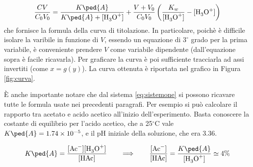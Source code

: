 \begin{equation}
    \frac{CV}{C_0V_0} = \frac{K\ped{A}}{K\ped{A} + \ce{[H3O+]}} + \frac{V + V_0}{C_0V_0} \left(\frac{K_w}{\ce{[H3O+]}} - \ce{[H3O+]} \right)
    \label{eq:curv}
\end{equation}
%
che fornisce la formula della curva di titolazione. In particolare, poichè è difficile isolare la varibile \ce{[H3O+]} in funzione di $V$, essendo
un equazione di $3^\circ$ grado per la prima variabile, è conveniente prendere $V$ come variabile dipendente 
(dall'equazione sopra è facile ricavarla). Per graficare la curva è poi sufficiente tracciarla ad assi invertiti (come $x = g(y)$).
La curva ottenuta è riportata nel grafico in Figura \ref{fig:curva}.

È anche importante notare che dal sistema \eqref{eq:sistemone} si possono ricavare tutte le formula usate nei precedenti paragrafi. Per esempio si può calcolare il rapporto tra acetato e acido acetico all'inizio dell'esperimento. Basta conoscere la costante di equilibrio per l'acido acetico, che a 25$^\circ$C vale
$K\ped{A} = 1.74 \times 10^{-5}$, e il pH iniziale della soluzione, che era 3.36.

\begin{equation}
    K\ped{A} = \frac{[\ce{Ac-}][\ce{H3O+}]}{[\ce{HAc}]} \qquad
    \Longrightarrow \qquad \frac{[\ce{Ac-}]}{[\ce{HAc}]} = \frac{K\ped{A}}{[\ce{H3O+}]} \simeq 4\%
    \label{eq:massa}
\end{equation}
